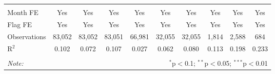 \begin{table}[!htbp]
\begin{tabular}{@{\extracolsep{1pt}}lccccccccc}
  & & & & & & & & & \\ 
\hline \\[-1.8ex] 
Month FE & Yes & Yes & Yes & Yes & Yes & Yes & Yes & Yes & Yes \\ 
Flag FE & Yes & Yes & Yes & Yes & Yes & Yes & Yes & Yes & Yes \\ 
Observations & 83,052 & 83,052 & 83,051 & 66,981 & 32,055 & 32,055 & 1,814 & 2,588 & 684 \\ 
R$^{2}$ & 0.102 & 0.072 & 0.107 & 0.027 & 0.062 & 0.080 & 0.113 & 0.198 & 0.233 \\ 
\hline 
\hline \\[-1.8ex] 
\textit{Note:}  & \multicolumn{9}{r}{$^{*}$p$<$0.1; $^{**}$p$<$0.05; $^{***}$p$<$0.01} \\ 
\end{tabular} 
\end{table} 
